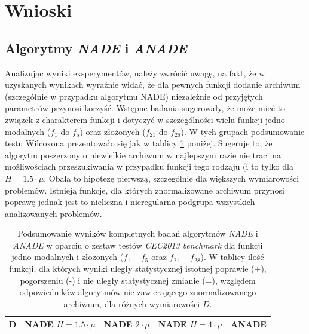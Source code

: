 \documentclass[12pt,a4paper]{report}
\begin{document}
{{{{{{{\section{Wnioski}
\subsection{Algorytmy \emph{NADE} i \emph{ANADE}}
\par{
Analizując wyniki eksperymentów, należy zwrócić uwagę, na fakt, że w uzyskanych wynikach wyraźnie widać, że dla pewnych funkcji dodanie archiwum (szczególnie w przypadku algorytmu NADE) niezależnie od przyjętych parametrów przynosi korzyść. Wstępne badania sugerowały, że może mieć to związek z charakterem funkcji i dotyczyć w szczególności wielu funkcji jedno modalnych ($f_1$ do $f_5$) oraz złożonych ($f_{21}$ do $f_{28}$). W tych grupach podsumowanie testu Wilcoxona prezentowało się jak w tablicy \ref{FULLSUMMARYUNIandCOMPLEX} poniżej. Sugeruje to, że algorytm poszerzony o niewielkie archiwum w najlepszym razie nie traci na możliwościach przeszukiwania w przypadku funkcji tego rodzaju (i to tylko dla $H = 1.5 \cdot \mu$. Obala to hipotezę pierwszą, szczególnie dla większych wymiarowości problemów. Istnieją funkcje, dla których znormalizowane archiwum przynosi poprawę jednak jest to nieliczna i nieregularna podgrupa wszystkich analizowanych problemów.
}
\begin{table}[h]
\centering
\caption{Podsumowanie wyników kompletnych badań algorytmów \emph{NADE} i \emph{ANADE} w oparciu o zestaw testów \emph{CEC2013 benchmark} dla funkcji jedno modalnych i złożonych ($f_1 - f_5$ oraz $f_{21} - f_{28}$). W tablicy ilość funkcji, dla których wyniki uległy statystycznej istotnej poprawie (+), pogorszeniu (-) i nie uległy statystycznej zmianie (=), względem odpowiedników algorytmów nie zawierającego znormalizowanego archiwum, dla różnych wymiarowości $D$.}
\label{FULLSUMMARYUNIandCOMPLEX}
\begin{tabular}{|c|c|c|c|c|c|c|c|c|c|c|c|c|}
\hline
{\bf D}  & \multicolumn{3}{c|}{{\bf NADE $H=1.5 \cdot \mu$}} & \multicolumn{3}{c|}{{\bf NADE $2 \cdot \mu$}} & \multicolumn{3}{c|}{{\bf NADE $H=4 \cdot \mu$}} & \multicolumn{3}{c|}{{\bf ANADE}} \\ \hline

\end{tabular}
\end{table}}}}}}}}
\end{document}
